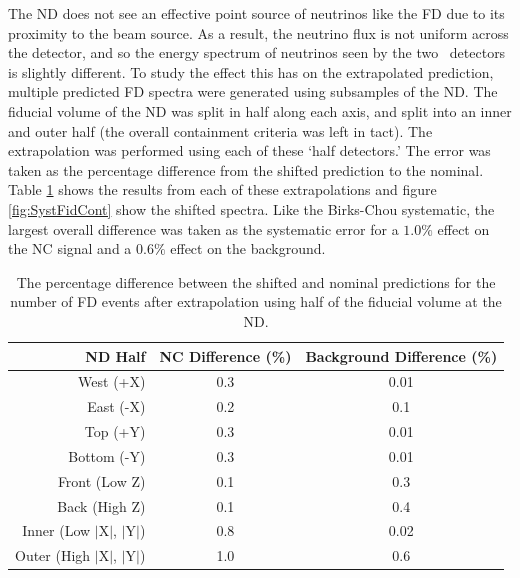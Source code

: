 The ND does not see an effective point source of neutrinos like the FD due to its proximity to the beam source. As a result, the neutrino flux is not uniform across the detector, and so the energy spectrum of neutrinos seen by the two \nova~detectors is slightly different. To study the effect this has on the extrapolated prediction, multiple predicted FD spectra were generated using subsamples of the ND. The fiducial volume of the ND was split in half along each axis, and split into an inner and outer half (the overall containment criteria was left in tact). The extrapolation was performed using each of these `half detectors.' The error was taken as the percentage difference from the shifted prediction to the nominal. Table \ref{tab:SystFidCont} shows the results from each of these extrapolations and figure \ref{fig:SystFidCont} show the shifted spectra. Like the Birks-Chou systematic, the largest overall difference was taken as the systematic error for a $1.0\%$ effect on the NC signal and a $0.6\%$ effect on the background.
\begin{table}[htb]
  \begin{center}
    \caption[ND Containment Systematic Errors]{The percentage difference between the shifted and nominal predictions for the number of FD events after extrapolation using half of the fiducial volume at the ND.}
    \label{tab:SystFidCont}
    \begin{tabular}{r c c}
      \hline\hline
      ND Half & NC Difference (\%) & Background Difference (\%) \\
      \hline
      West (+X) & 0.3 & 0.01 \\
      East (-X) & 0.2 & 0.1 \\
      Top (+Y) & 0.3 & 0.01 \\
      Bottom (-Y) & 0.3 & 0.01 \\
      Front (Low Z) & 0.1 & 0.3 \\
      Back (High Z) & 0.1 & 0.4 \\
      Inner (Low $\vert$X$\vert$, $\vert$Y$\vert$) & 0.8 & 0.02 \\
      Outer (High $\vert$X$\vert$, $\vert$Y$\vert$) & 1.0 & 0.6 \\
      \hline
    \end{tabular}
  \end{center}
\end{table}

